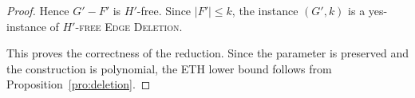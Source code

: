 \documentclass[a4paper,UKenglish,cleveref, autoref, thm-restate]{lipics-v2021}
\begin{document}
\begin{proof}
Hence $G'-F'$ is $H'$-free.
Since $|F'|\leq k$, the instance $(G',k)$ is a yes-instance of
\textsc{$H'$-free Edge Deletion}.

This proves the correctness of the reduction.
Since the parameter is preserved and the construction is polynomial, the ETH
lower bound follows from Proposition~\ref{pro:deletion}.
\end{proof}

\end{document}
